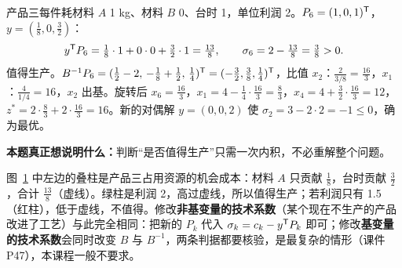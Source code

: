 \begin{examplebox}[例 6.5　主例新增产品三]
产品三每件耗材料 $A$ 1 kg、材料 $B$ 0、台时 1，单位利润 2。$P_6=(1,0,1)^{\mathsf T}$，$y=(\frac18,0,\frac32)$：
\[
y^{\mathsf T} P_6=\tfrac18\cdot1+0\cdot0+\tfrac32\cdot1=\tfrac{13}{8},\qquad \sigma_6=2-\tfrac{13}{8}=\tfrac38>0 .
\]
值得生产。$B^{-1}P_6=(\frac12-2,\,-\frac18+\frac12,\,\frac14)^{\mathsf T}=(-\frac32,\frac38,\frac14)^{\mathsf T}$，比值 $x_2$：$\frac{2}{3/8}=\frac{16}{3}$，$x_1$：$\frac{4}{1/4}=16$，$x_2$ 出基。旋转后 $x_6=\frac{16}{3}$，$x_1=4-\frac14\cdot\frac{16}{3}=\frac83$，$x_4=4+\frac32\cdot\frac{16}{3}=12$，$z^*=2\cdot\frac83+2\cdot\frac{16}{3}=16$。新的对偶解 $y=(0,0,2)$ 使 $\sigma_2=3-2\cdot2=-1\le0$，确为最优。\par
\textbf{本题真正想说明什么：}判断“是否值得生产”只需一次内积，不必重解整个问题。
\end{examplebox}

\begin{figure}[!htbp]\centering
{}
\label{fig:newvar}
\end{figure}

图~\ref{fig:newvar} 中左边的叠柱是产品三占用资源的机会成本：材料 $A$ 只贡献 $\frac18$，台时贡献 $\frac32$，合计 $\frac{13}{8}$（虚线）。绿柱是利润 2，高过虚线，所以值得生产；若利润只有 1.5（红柱），低于虚线，不值得。修改\textbf{非基变量的技术系数}（某个现在不生产的产品改进了工艺）与此完全相同：把新的 $P_k$ 代入 $\sigma_k=c_k-y^{\mathsf T} P_k$ 即可；修改\textbf{基变量的技术系数}会同时改变 $B$ 与 $B^{-1}$，两条判据都要核验，是最复杂的情形（课件 P47），本课程一般不要求。

